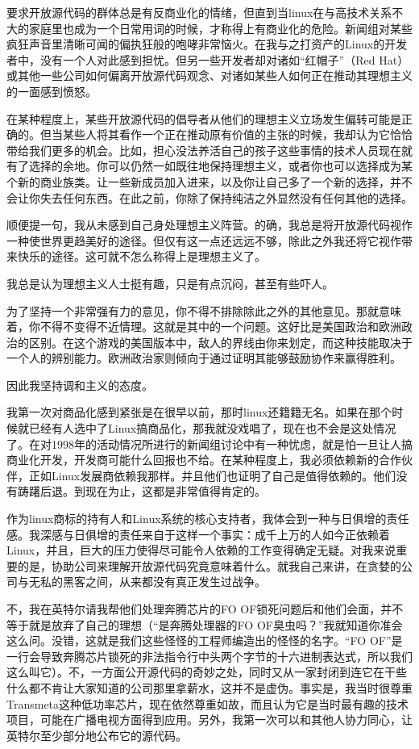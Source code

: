 要求开放源代码的群体总是有反商业化的情绪，但直到当linux在与高技术关系不大的家庭里也成为一个日常用词的时候，才称得上有商业化的危险。新闻组对某些疯狂声音里清晰可闻的偏执狂般的咆哮非常恼火。在我与之打资产的Linux的开发者中，没有一个人对此感到担忧。但另一些开发者却对诸如“红帽子”（Red Hat）或其他一些公司如何偏离开放源代码观念、对诸如某些人如何正在推动其理想主义的一面感到愤怒。

在某种程度上，某些开放源代码的倡导者从他们的理想主义立场发生偏转可能是正确的。但当某些人将其看作一个正在推动原有价值的主张的时候，我却认为它恰恰带给我们更多的机会。比如，担心没法养活自己的孩子这些事情的技术人员现在就有了选择的余地。你可以仍然一如既往地保持理想主义，或者你也可以选择成为某个新的商业族类。让一些新成员加入进来，以及你让自己多了一个新的选择，并不会让你失去任何东西。在此之前，你除了保持纯洁之外显然没有任何其他的选择。

顺便提一句，我从未感到自己身处理想主义阵营。的确，我总是将开放源代码视作一种使世界更趋美好的途径。但仅有这一点还远远不够，除此之外我还将它视作带来快乐的途径。这可就不怎么称得上是理想主义了。

我总是认为理想主义人士挺有趣，只是有点沉闷，甚至有些吓人。

为了坚持一个非常强有力的意见，你不得不排除除此之外的其他意见。那就意味着，你不得不变得不近情理。这就是其中的一个问题。这好比是美国政治和欧洲政治的区别。在这个游戏的美国版本中，敌人的界线由你来划定，而这种技能取决于一个人的辨别能力。欧洲政治家则倾向于通过证明其能够鼓励协作来赢得胜利。

因此我坚持调和主义的态度。

我第一次对商品化感到紧张是在很早以前，那时linux还籍籍无名。如果在那个时候就已经有人选中了Linux搞商品化，那我就没戏唱了，现在也不会是这处情况了。在对1998年的活动情况所进行的新闻组讨论中有一种忧虑，就是怕一旦让人搞商业化开发，开发商可能什么回报也不给。在某种程度上，我必须依赖新的合作伙伴，正如Linux发展商依赖我那样。并且他们也证明了自己是值得依赖的。他们没有踌躇后退。到现在为止，这都是非常值得肯定的。

作为linux商标的持有人和Linux系统的核心支持者，我体会到一种与日俱增的责任感。我深感与日俱增的责任来自于这样一个事实：成千上万的人如今正依赖着Linux，并且，巨大的压力使得尽可能令人依赖的工作变得确定无疑。对我来说重要的是，协助公司来理解开放源代码究竟意味着什么。就我自己来讲，在贪婪的公司与无私的黑客之间，从来都没有真正发生过战争。

不，我在英特尔请我帮他们处理奔腾芯片的FO OF锁死问题后和他们会面，并不等于就是放弃了自己的理想（“是奔腾处理器的FO OF臭虫吗？”我就知道你准会这么问。没错，这就是我们这些怪怪的工程师编造出的怪怪的名字。“FO OF”是一行会导致奔腾芯片锁死的非法指令行中头两个字节的十六进制表达式，所以我们这么叫它）。不，一方面公开源代码的奇妙之处，同时又从一家封闭到连它在干些什么都不肯让大家知道的公司那里拿薪水，这并不是虚伪。事实是，我当时很尊重Transmeta这种低功率芯片，现在依然尊重如故，而且认为它是当时最有趣的技术项目，可能在广播电视方面得到应用。另外，我第一次可以和其他人协力同心，让英特尔至少部分地公布它的源代码。

